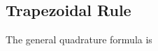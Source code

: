 \documentclass{article}
\begin{document}
            
            
            
            
            \subsection{Trapezoidal Rule}
              The general quadrature formula is
\end{document}
